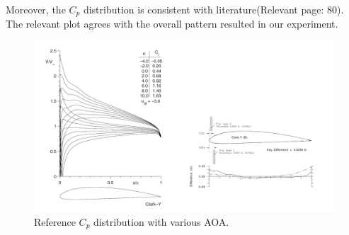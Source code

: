 \documentclass[runningheads]{llncs}
\begin{document}
\noindent
Moreover, the $C_p$ distribution is consistent with literature{\cite{lyon_broeren_giguere_gopalarathnam_selig_1997}}(Relevant page: 80). The relevant plot agrees with the overall pattern resulted in our experiment.

\begin{figure}[h]
    \centering
    \includegraphics[width=\textwidth]{figures/reference_cp.png}
    \caption{Reference $C_p$ distribution with various AOA.}
    \label{fig:lit_cp}
\end{figure}
\end{document}
